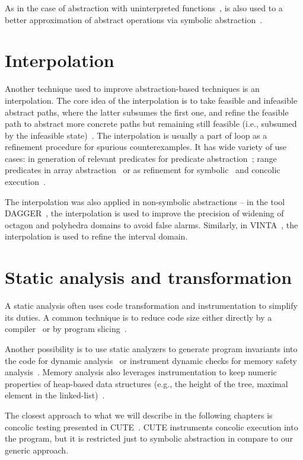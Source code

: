 As in the case of abstraction with uninterpreted functions~\cite{Gange2016}, \smt is also used to
a better approximation of abstract operations via symbolic abstraction~\cite{Thakur2012}.


\section{Interpolation}
\label{sec:interpolation}

Another technique used to improve abstraction-based techniques is an
interpolation. The core idea of the interpolation is to take feasible and
infeasible abstract paths, where the latter subsumes the first one, and refine
the feasible path to abstract more concrete paths but remaining still feasible
(i.e., subsumed by the infeasible state)~\cite{Mcmillan2003interpolation}.  The
interpolation is usually a part of \cegar loop as a refinement procedure for
spurious counterexamples. It has wide variety of use cases: in generation of
relevant predicates for predicate abstraction~\cite{Henzinger2004abstractions,
Cimatti2016}; range predicates in array abstraction~\cite{Jhala2007array} or
as refinement for symbolic~\cite{Ibing2016} and concolic execution~\cite{Jaffar2013}.

The interpolation was also applied in non-symbolic abstractions -- in the tool
DAGGER~\cite{Gulavani2008}, the interpolation is used to improve the precision
of widening of octagon and polyhedra domains to avoid false alarms. Similarly,
in VINTA~\cite{Albarghouthi2012}, the interpolation is used to refine the interval domain.

\section{Static analysis and transformation}

A static analysis often uses code transformation and instrumentation to
simplify its duties. A common technique is to reduce code size either directly
by a compiler~\cite{Namjoshi2018} or by program slicing~\cite{Chalupa2018}.

Another possibility is to use static analyzers to generate program invariants into the code for dynamic analysis~\cite{Gurfinkel2015} or instrument dynamic checks for memory safety analysis~\cite{Chalupa2019}.
Memory analysis also leverages instrumentation to keep numeric properties of heap-based data structures (e.g., the height of the tree, maximal element in the linked-list)~\cite{Magill2010}.

The closest approach to what we will describe in the following chapters is
concolic testing presented in CUTE~\cite{Sen2005}. CUTE instruments concolic
execution into the program, but it is restricted just to symbolic abstraction
in compare to our generic approach.
